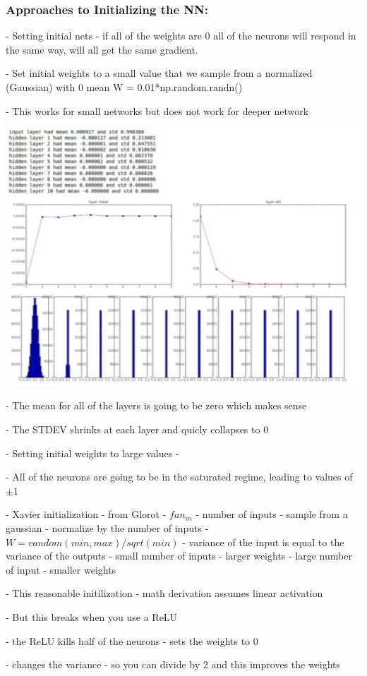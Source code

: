 \subsubsection{Approaches to Initializing the NN:}

 - Setting initial nets - if all of the weights are 0 all of the neurons will respond in the same way, will all get the same gradient. 

 - Set initial weights to a small value that we sample from a normalized (Gaussian) with 0 mean W = 0.01*np.random.randn()
   	
   	- This works for small networks but does not work for deeper network
      	
      	\includegraphics[width=0.5\columnwidth]{fei_fei_li/lecture_06/ecture_06_normalized-activation.png}
    
   - The mean for all of the layers is going to be zero which makes sense 

   - The STDEV shrinks at each layer and quicly collapses to 0 

 - Setting initial weights to large values - 
   	
   	
   
   - All of the neurons are going to be in the saturated regime, leading to values of $\pm1$ 
   
 - Xavier initialization - from Glorot
    - ${fan_{in}}$ - number of inputs
    - sample from a gaussian
    - normalize by the number of inputs
    - $W = random(min,max)/sqrt(min)$
    - variance of the input is equal to the variance of the outputs
       - small number of inputs - larger weights
       - large number of input - smaller weights
    
 - This reasonable initilization - math derivation assumes linear activation

 - But this breaks when you use a ReLU
   	
   	- the ReLU kills half of the neurons - sets the weights to 0 
    
   - changes the variance - so you can divide by 2 and this improves the weights

